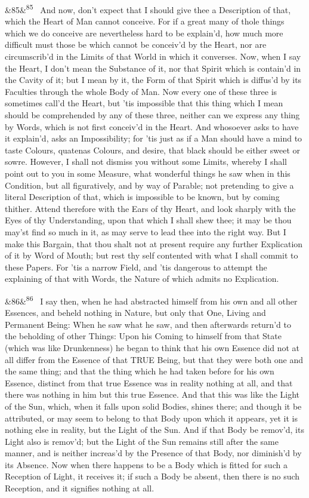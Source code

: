 \documentclass[12pt]{article}
\newcommand{\para}[1][]{\par\noindent\ifx&#1&\else\textsuperscript{\footnotesize #1}~\fi}
\begin{document}
\para[85] And now, don't expect that I should give thee a Description of that, which the Heart of Man cannot conceive. For if a great many of thole things which we do conceive are nevertheless hard to be explain'd, how much more difficult must those be which cannot be conceiv'd by the Heart, nor are circumscrib'd in the Limits of that World in which it converses. Now, when I say the Heart, I don't mean the Substance of it, nor that Spirit which is contain'd in the Cavity of it; but I mean by it, the Form of that Spirit which is diffus'd by its Faculties through the whole Body of Man. Now every one of these three is sometimes call'd the Heart, but 'tis impossible that this thing which I mean should be comprehended by any of these three, neither can we express any thing by Words, which is not first conceiv'd in the Heart. And whosoever asks to have it explain'd, asks an Impossibility; for 'tis just as if a Man should have a mind to taste Colours, quatenas Colours, and desire, that black should be either sweet or sowre. However, I shall not dismiss you without some Limits, whereby I shall point out to you in some Measure, what wonderful things he saw when in this Condition, but all figuratively, and by way of Parable; not pretending to give a literal Description of that, which is impossible to be known, but by coming thither. Attend therefore with the Ears of thy Heart, and look sharply with the Eyes of thy Understanding, upon that which I shall shew thee; it may be thou may'st find so much in it, as may serve to lead thee into the right way. But I make this Bargain, that thou shalt not at present require any further Explication of it by Word of Mouth; but rest thy self contented with what I shall commit to these Papers. For 'tis a narrow Field, and 'tis dangerous to attempt the explaining of that with Words, the Nature of which admits no Explication.

\para[86] I say then, when he had abstracted himself from his own and all other Essences, and beheld nothing in Nature, but only that One, Living and Permanent Being: When he saw what he saw, and then afterwards return'd to the beholding of other Things: Upon his Coming to himself from that State (which was like Drunkenness) he began to think that his own Essence did not at all differ from the Essence of that TRUE Being, but that they were both one and the same thing; and that the thing which he had taken before for his own Essence, distinct from that true Essence was in reality nothing at all, and that there was nothing in him but this true Essence. And that this was like the Light of the Sun, which, when it falls upon solid Bodies, shines there; and though it be attributed, or may seem to belong to that Body upon which it appears, yet it is nothing else in reality, but the Light of the Sun. And if that Body be remov'd, its Light also is remov'd; but the Light of the Sun remains still after the same manner, and is neither increas'd by the Presence of that Body, nor diminish'd by its Absence. Now when there happens to be a Body which is fitted for such a Reception of Light, it receives it; if such a Body be absent, then there is no such Reception, and it signifies nothing at all.
\end{document}
